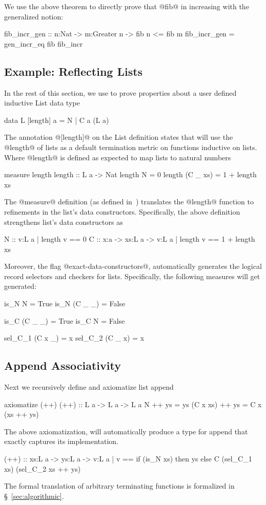 We use the above theorem to directly prove
that @fib@ in increasing with the generalized notion:
%
\begin{code}
  fib_incr_gen :: n:Nat
               -> m:Greater n
               -> {fib n <= fib m}
  fib_incr_gen = gen_incr_eq fib fib_incr
\end{code}


\subsection{Example: Reflecting Lists} \label{subsec:list}

%
In the rest of this section, we use \libname to prove
properties about a user defined inductive List data type
\begin{code}
  data L [length] a = N | C a (L a)
\end{code}
%
The annotation @[length]@ on the List definition
states that \liquidHaskell will use the @length@ of lists
as a default termination metric on functions inductive on lists.
%
Where @length@ is defined as expected to map lists to natural numbers
\begin{code}
  measure length
  length :: L a -> Nat
  length N        = 0
  length (C _ xs) = 1 + length xs
\end{code}
%
The @measure@ definition (as defined in~\citep{Vazou14})
translates the @length@ function to refinements in the list's
data constructors.
%
Specifically, the above definition strengthens list's data constructors
as
\begin{code}
 N :: {v:L a | length v == 0 }
 C :: x:a -> xs:L a
   -> {v:L a | length v == 1 + length xs }
\end{code}

Moreover, the \liquidHaskell flag @exact-data-constructors@,
automatically generates the
logical record selectors and checkers for lists.
%
Specifically, the following measures will get generated:
\begin{code}
  is_N N          = True
  is_N (C _ _)    = False

  is_C (C _ _)    = True
  is_C N          = False

  sel_C_1 (C x _) = x
  sel_C_2 (C _ x) = x
\end{code}

\subsection{Append Associativity}\label{subsec:append}
Next we recursively define and axiomatize list append
\begin{code}
  axiomatize (++)
  (++) :: L a -> L a -> L a
  N        ++ ys = ys
  (C x xs) ++ ys = C x (xs ++ ys)
\end{code}
%
The above axiomatization, will automatically produce a type for append
that exactly captures its implementation.
%
\begin{code}
  (++) :: xs:L a -> ys:L a ->
    {v:L a |
       v == if (is_N xs) then ys
            else C (sel_C_1 xs)
                   (sel_C_2 xs ++ ys) }
\end{code}
%
The formal translation of arbitrary terminating functions
is formalized in \S~\ref{sec:algorithmic}.
